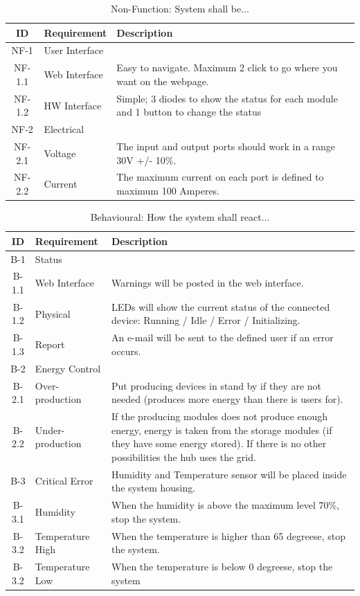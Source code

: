 		\begin{table}[h!]
			\begin{tabular} [b] {| c |  p{3cm} | p{10cm} |}
			\hline
			\textbf{ID} & \textbf{Requirement} & \textbf{Description} \\\hline
			NF-1 & User Interface 	&  \\ \hline
			NF-1.1 & Web Interface 	& Easy to navigate. Maximum 2 click to go where you want on the webpage. \\ \hline
			NF-1.2 & HW Interface 	& Simple; 3 diodes to show the status for each module and 1 button to change the status \\ \hline
			NF-2 & Electrical 		&  \\ \hline
			NF-2.1 & Voltage 		& The input and output ports should work in a range 30V +/-  10\%.\\ \hline
			NF-2.2 & Current 		& The maximum current on each port is defined to maximum 100 Amperes. \\ \hline
		\end{tabular}
		\caption{Non-Function: System shall be...}
		\end{table}
		\newpage
		\begin{table}[h!]
			\begin{tabular} [b] {| c |  p{3cm} | p{10cm} |}
			\hline
			\textbf{ID} & \textbf{Requirement} & \textbf{Description} \\\hline
			B-1 & Status &  \\\hline
			B-1.1 & Web Interface 	 & Warnings will be posted in the web interface. \\\hline
			B-1.2 & Physical 		 & LEDs will show the current status of the connected device: Running / Idle / Error / Initializing. \\\hline
			B-1.3 & Report 			 & An e-mail will be sent to the defined user if an error occurs. \\\hline
			B-2 & Energy Control 	 &  \\\hline
			B-2.1 & Over-production 	 & Put producing devices in stand by if they are not needed (produces more energy than there is users for). \\\hline
			B-2.2 & Under-production  & If the producing modules does not produce enough energy, energy is taken from the storage
				      modules (if they have some energy stored). If there is no other possibilities the hub uses the grid. \\\hline
			B-3 & Critical Error 		& Humidity and Temperature sensor will be placed inside the system housing. \\\hline
			B-3.1 & Humidity 		 & When the humidity is above the maximum level 70\%, stop the system. \\\hline
			B-3.2 & Temperature High& When the temperature is higher than 65 degreese,  stop the system.\\\hline
			B-3.2 & Temperature Low & When the temperature is below 0 degreese, stop the system\\\hline
		\end{tabular}
		\caption{Behavioural: How the system shall react...}
		\end{table}
		
